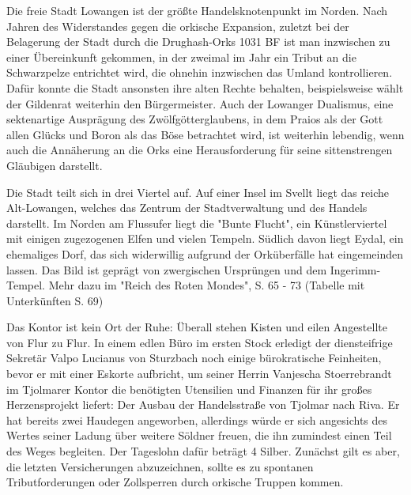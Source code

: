 \spaltenende



\spaltenanfang



Die freie Stadt Lowangen ist der größte Handelsknotenpunkt im Norden. Nach Jahren des Widerstandes gegen die orkische Expansion, zuletzt bei der Belagerung der Stadt durch die Drughash-Orks 1031 BF ist man inzwischen zu einer Übereinkunft gekommen, in der zweimal im Jahr ein Tribut an die Schwarzpelze entrichtet wird, die ohnehin inzwischen das Umland kontrollieren. Dafür konnte die Stadt ansonsten ihre alten Rechte behalten, beispielsweise wählt der Gildenrat weiterhin den Bürgermeister. Auch der Lowanger Dualismus, eine sektenartige Ausprägung des Zwölfgötterglaubens, in dem Praios als der Gott allen Glücks und Boron als das Böse betrachtet wird, ist weiterhin lebendig, wenn auch die Annäherung an die Orks eine Herausforderung für seine sittenstrengen Gläubigen darstellt.


Die Stadt teilt sich in drei Viertel auf. Auf einer Insel im Svellt liegt das reiche Alt-Lowangen, welches das Zentrum der Stadtverwaltung und des Handels darstellt. Im Norden am Flussufer liegt die "Bunte Flucht", ein Künstlerviertel mit einigen zugezogenen Elfen und vielen Tempeln. Südlich davon liegt Eydal, ein ehemaliges Dorf, das sich widerwillig aufgrund der Orküberfälle hat eingemeinden lassen. Das Bild ist geprägt von zwergischen Ursprüngen und dem Ingerimm-Tempel. Mehr dazu im "Reich des Roten Mondes", S. 65 - 73 (Tabelle mit Unterkünften S. 69)


Das Kontor ist kein Ort der Ruhe: Überall stehen Kisten und eilen Angestellte von Flur zu Flur. In einem edlen Büro im ersten Stock erledigt der diensteifrige Sekretär Valpo Lucianus von Sturzbach noch einige bürokratische Feinheiten, bevor er mit einer Eskorte aufbricht, um seiner Herrin Vanjescha Stoerrebrandt im Tjolmarer Kontor die benötigten Utensilien und Finanzen für ihr großes Herzensprojekt liefert: Der Ausbau der Handelsstraße von Tjolmar nach Riva. Er hat bereits zwei Haudegen angeworben, allerdings würde er sich angesichts des Wertes seiner Ladung über weitere Söldner freuen, die ihn zumindest einen Teil des Weges begleiten. Der Tageslohn dafür beträgt 4 Silber. Zunächst gilt es aber, die letzten Versicherungen abzuzeichnen, sollte es zu spontanen Tributforderungen oder Zollsperren durch orkische Truppen kommen.


